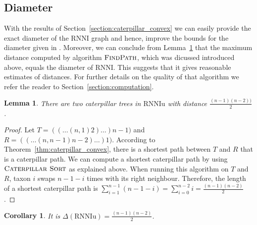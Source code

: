 \documentclass{amsart}
\newcommand{\rnni}{\mathrm{RNNI}}
\newcommand{\rnniu}{\mathrm{RNNIu}}
\newcommand{\csort}{\textsc{Caterpillar Sort}}
\newcommand{\findpath}{\textsc{FindPath}}
\newtheorem{lemma}[definition]{Lemma}
\newtheorem{corollary}[definition]{Corollary}
\begin{document}
\subsection{Diameter}
\label{section:diameter}

With the results of Section~\ref{section:caterpillar_convex} we can easily provide the exact diameter of the $\rnni$ graph and hence, improve the bounds for the diameter given in \autocite{Gavryushkin2017}.
Moreover, we can conclude from Lemma~\ref{lemma:caterpillar_diameter} that the maximum distance computed by algorithm $\findpath$, which was dicussed introduced above, equals the diameter of $\rnni$.
This suggests that it gives reasonable estimates of distances.
For further details on the quality of that algorithm we refer the reader to Section~\ref{section:computation}.

\begin{lemma}
	There are two caterpillar trees in $\rnniu$ with distance $\frac{(n-1)(n-2))}{2}$.
	\label{lemma:caterpillar_diameter}
\end{lemma}

\begin{proof}
	Let $T = (( \dots (n,1)2)\dots)n-1)$ and $R = (( \dots (n,n-1)n-2)\dots)1)$.
    According to Theorem~\ref{thm:caterpillar_convex}, there is a shortest path between $T$ and $R$ that is a caterpillar path.
    We can compute a shortest caterpillar path by using $\csort$ as explained above.
    When running this algorithm on $T$ and $R$, taxon $i$ swaps $n-1-i$ times with its right neighbour.
    Therefore, the length of a shortest caterpillar path is $\sum\limits_{i=1}^{n-1}(n-1-i) = \sum\limits_{i=0}^{n-2}i = \frac{(n-1)(n-2)}{2}$.
\end{proof}

\begin{corollary}
    It is $\Delta(\rnniu) = \frac{(n-1)(n-2)}{2}$.
\end{corollary}

\end{document}
